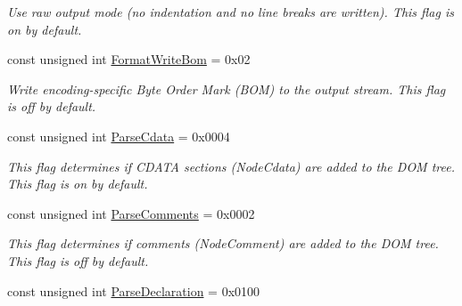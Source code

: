 \begin{DoxyCompactItemize}
\begin{DoxyCompactList}\small\item\em Use raw output mode (no indentation and no line breaks are written). This flag is on by default. \item\end{DoxyCompactList}\item 
\hypertarget{namespaceMezzanine_1_1xml_a984338522c305d986b8fa5a3818bf338}{
const unsigned int \hyperlink{namespaceMezzanine_1_1xml_a984338522c305d986b8fa5a3818bf338}{FormatWriteBom} = 0x02}
\label{namespaceMezzanine_1_1xml_a984338522c305d986b8fa5a3818bf338}

\begin{DoxyCompactList}\small\item\em Write encoding-\/specific Byte Order Mark (BOM) to the output stream. This flag is off by default. \item\end{DoxyCompactList}\item 
\hypertarget{namespaceMezzanine_1_1xml_a33da07bddbf04d06d501881b3e13d616}{
const unsigned int \hyperlink{namespaceMezzanine_1_1xml_a33da07bddbf04d06d501881b3e13d616}{ParseCdata} = 0x0004}
\label{namespaceMezzanine_1_1xml_a33da07bddbf04d06d501881b3e13d616}

\begin{DoxyCompactList}\small\item\em This flag determines if CDATA sections (NodeCdata) are added to the DOM tree. This flag is on by default. \item\end{DoxyCompactList}\item 
\hypertarget{namespaceMezzanine_1_1xml_af7f6768222908469cd315b24c4095f4f}{
const unsigned int \hyperlink{namespaceMezzanine_1_1xml_af7f6768222908469cd315b24c4095f4f}{ParseComments} = 0x0002}
\label{namespaceMezzanine_1_1xml_af7f6768222908469cd315b24c4095f4f}

\begin{DoxyCompactList}\small\item\em This flag determines if comments (NodeComment) are added to the DOM tree. This flag is off by default. \item\end{DoxyCompactList}\item 
\hypertarget{namespaceMezzanine_1_1xml_a642e0534edcb90c314a3767941077cd0}{
const unsigned int \hyperlink{namespaceMezzanine_1_1xml_a642e0534edcb90c314a3767941077cd0}{ParseDeclaration} = 0x0100}
\label{namespaceMezzanine_1_1xml_a642e0534edcb90c314a3767941077cd0}


\end{DoxyCompactItemize}
